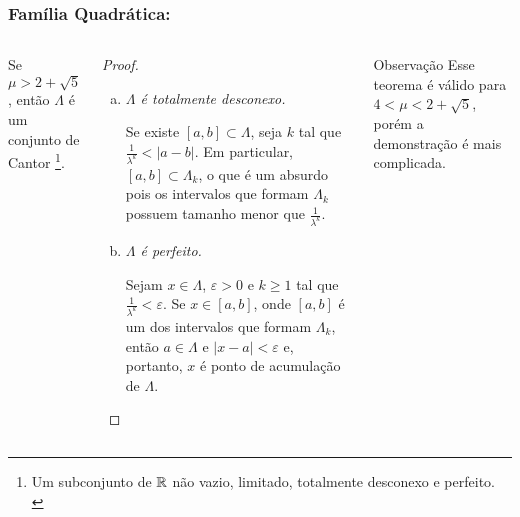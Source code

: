 
\begin{frame}
\vspace{5pt}
\frametitle{Família Quadrática: \subsecname}
\begin{columns}
\column{\dimexpr\paperwidth-15pt}

\begin{theorem}
Se $\mu > 2 + \sqrt{5}$, então $\Lambda$ é um conjunto de Cantor \footnote{Um subconjunto de $\mathbb{R}$ não vazio, limitado, totalmente desconexo e perfeito.\\}.
\end{theorem}

\begin{proof}
\begin{enumerate}[a)]
\item \textit{$\Lambda$ é totalmente desconexo.}

Se existe $[a, b] \subset \Lambda$, seja $k$ tal que $\frac{1}{\lambda^k} < |a - b|$.
Em particular, $[a, b] \subset \Lambda_k$, o que é um absurdo pois os intervalos que formam $\Lambda_k$ possuem tamanho menor que $\frac{1}{\lambda^k}$.

\item \textit{$\Lambda$ é perfeito.}

Sejam $x \in \Lambda$, $\varepsilon > 0$ e $k \geq 1$ tal que $\frac{1}{\lambda^k} < \varepsilon$.
Se $x \in [a, b]$, onde $[a, b]$ é um dos intervalos que formam $\Lambda_k$, então $a \in \Lambda$ e $|x - a| < \varepsilon$ e, portanto, $x$ é ponto de acumulação de $\Lambda$.
\qedhere
\end{enumerate}
\end{proof}

\begin{block}{Observação}
Esse teorema é válido para $4 < \mu < 2 + \sqrt{5}$, porém a demonstração é mais complicada.
\end{block}

\end{columns}
\end{frame}
